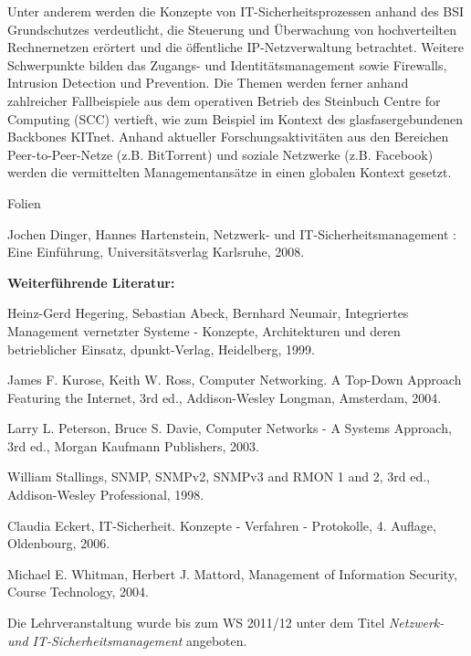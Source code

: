 \begin{course}
\begin{content}
 

Unter anderem werden die Konzepte von IT-Sicherheitsprozessen anhand des BSI Grundschutzes verdeutlicht, die Steuerung und Überwachung von hochverteilten Rechnernetzen erörtert und die öffentliche IP-Netzverwaltung betrachtet. Weitere Schwerpunkte bilden das Zugangs- und Identitätsmanagement sowie Firewalls, Intrusion Detection und Prevention. Die Themen werden ferner anhand zahlreicher Fallbeispiele aus dem operativen Betrieb des Steinbuch Centre for Computing (SCC) vertieft, wie zum Beispiel im Kontext des glasfasergebundenen Backbones KITnet. Anhand aktueller Forschungsaktivitäten aus den Bereichen Peer-to-Peer-Netze (z.B. BitTorrent) und soziale Netzwerke (z.B. Facebook) werden die vermittelten Managementansätze in einen globalen Kontext gesetzt.


\end{content}

\begin{media}Folien

\end{media}

\begin{literature} 

Jochen Dinger, Hannes Hartenstein, Netzwerk- und IT-Sicherheitsmanagement : Eine Einführung, Universitätsverlag Karlsruhe, 2008.

 

\textbf{Weiterführende Literatur:}

  

Heinz-Gerd Hegering, Sebastian Abeck, Bernhard Neumair, Integriertes Management vernetzter Systeme - Konzepte, Architekturen und deren betrieblicher Einsatz, dpunkt-Verlag, Heidelberg, 1999.

  

James F. Kurose, Keith W. Ross, Computer Networking. A Top-Down Approach Featuring the Internet, 3rd ed., Addison-Wesley Longman, Amsterdam, 2004.

  

Larry L. Peterson, Bruce S. Davie, Computer Networks - A Systems Approach, 3rd ed., Morgan Kaufmann Publishers, 2003.

  

William Stallings, SNMP, SNMPv2, SNMPv3 and RMON 1 and 2, 3rd ed., Addison-Wesley Professional, 1998.

  

Claudia Eckert, IT-Sicherheit. Konzepte - Verfahren - Protokolle, 4. Auflage, Oldenbourg, 2006.

  

Michael E. Whitman, Herbert J. Mattord, Management of Information Security, Course Technology, 2004.

 \end{literature}

\begin{remarks}Die Lehrveranstaltung wurde bis zum WS 2011/12 unter dem Titel \emph{Netzwerk- und IT-Sicherheitsmanagement} angeboten.

\end{remarks}

\end{course}